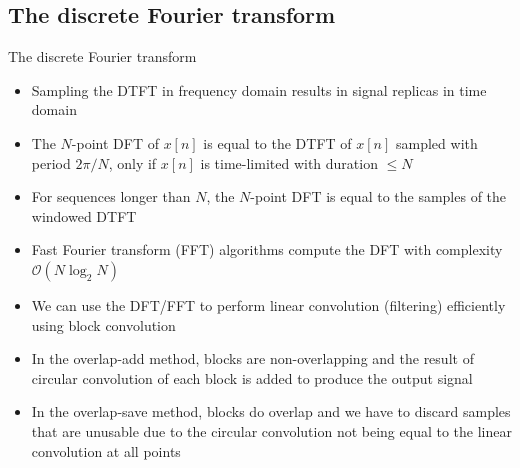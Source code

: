 \documentclass[10pt]{beamer}
\begin{document}
\subsection{The discrete Fourier transform}
\begin{frame}{The discrete Fourier transform}
\begin{itemize}
	\item Sampling the DTFT in frequency domain results in signal replicas in time domain
	\item The $N$-point DFT of $x[n]$ is equal to the DTFT of $x[n]$ sampled with period $2\pi/N$, only if $x[n]$ is time-limited with duration $\leq N$
	\item For sequences longer than $N$, the $N$-point DFT is equal to the samples of the windowed DTFT
	\item Fast Fourier transform (FFT) algorithms compute the DFT with complexity $\mathcal{O}(N\log_2 N)$
	\item We can use the DFT/FFT to perform linear convolution (filtering) efficiently using block convolution
	\item In the overlap-add method, blocks are non-overlapping and the result of circular convolution of each block is added to produce the output signal
	\item In the overlap-save method, blocks do overlap and we have to discard samples that are unusable due to the circular convolution not being equal to the linear convolution at all points
\end{itemize}
\end{frame}
\end{document}
